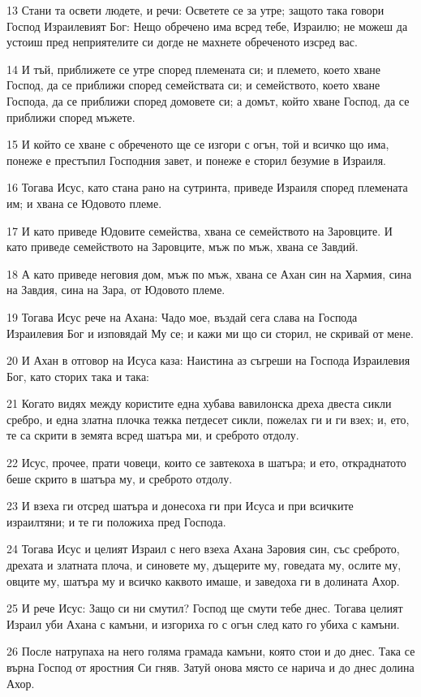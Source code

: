 \par 13 Стани та освети людете, и речи: Осветете се за утре; защото така говори Господ Израилевият Бог: Нещо обречено има всред тебе, Израилю; не можеш да устоиш пред неприятелите си догде не махнете обреченото изсред вас.
\par 14 И тъй, приближете се утре според племената си; и племето, което хване Господ, да се приближи според семействата си; и семейството, което хване Господа, да се приближи според домовете си; а домът, който хване Господ, да се приближи според мъжете.
\par 15 И който се хване с обреченото ще се изгори с огън, той и всичко що има, понеже е престъпил Господния завет, и понеже е сторил безумие в Израиля.
\par 16 Тогава Исус, като стана рано на сутринта, приведе Израиля според племената им; и хвана се Юдовото племе.
\par 17 И като приведе Юдовите семейства, хвана се семейството на Заровците. И като приведе семейството на Заровците, мъж по мъж, хвана се Завдий.
\par 18 А като приведе неговия дом, мъж по мъж, хвана се Ахан син на Хармия, сина на Завдия, сина на Зара, от Юдовото племе.
\par 19 Тогава Исус рече на Ахана: Чадо мое, въздай сега слава на Господа Израилевия Бог и изповядай Му се; и кажи ми що си сторил, не скривай от мене.
\par 20 И Ахан в отговор на Исуса каза: Наистина аз съгреши на Господа Израилевия Бог, като сторих така и така:
\par 21 Когато видях между користите една хубава вавилонска дреха двеста сикли сребро, и една златна плочка тежка петдесет сикли, пожелах ги и ги взех; и, ето, те са скрити в земята всред шатъра ми, и среброто отдолу.
\par 22 Исус, прочее, прати човеци, които се завтекоха в шатъра; и ето, откраднатото беше скрито в шатъра му, и среброто отдолу.
\par 23 И взеха ги отсред шатъра и донесоха ги при Исуса и при всичките израилтяни; и те ги положиха пред Господа.
\par 24 Тогава Исус и целият Израил с него взеха Ахана Заровия син, със среброто, дрехата и златната плоча, и синовете му, дъщерите му, говедата му, ослите му, овците му, шатъра му и всичко каквото имаше, и заведоха ги в долината Ахор.
\par 25 И рече Исус: Защо си ни смутил? Господ ще смути тебе днес. Тогава целият Израил уби Ахана с камъни, и изгориха го с огън след като го убиха с камъни.
\par 26 После натрупаха на него голяма грамада камъни, която стои и до днес. Така се върна Господ от яростния Си гняв. Затуй онова място се нарича и до днес долина Ахор.


